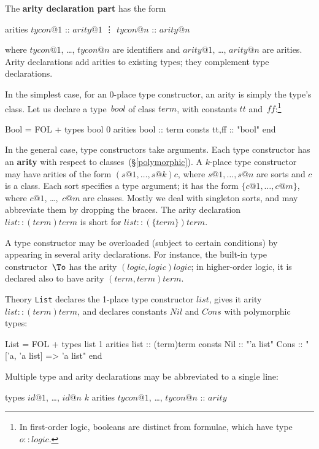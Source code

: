 The {\bf arity declaration part} has the form
\begin{ttbox}
arities \(tycon@1\) :: \(arity@1\)
        \vdots
        \(tycon@n\) :: \(arity@n\)
\end{ttbox}
where $tycon@1$, \ldots, $tycon@n$ are identifiers and $arity@1$, \ldots,
$arity@n$ are arities.  Arity declarations add arities to existing
types; they complement type declarations.

In the simplest case, for an 0-place type constructor, an arity is simply
the type's class.  Let us declare a type~$bool$ of class $term$, with
constants $tt$ and~$ff$:\footnote{In first-order logic, booleans are
distinct from formulae, which have type $o::logic$.}
\begin{ttbox} 
Bool = FOL +
types   bool 0
arities bool    :: term
consts  tt,ff   :: "bool"
end
\end{ttbox}
In the general case, type constructors take arguments.  Each type
constructor has an {\bf arity} with respect to
classes~(\S\ref{polymorphic}).  A $k$-place type constructor may have
arities of the form $(s@1,\ldots,s@k)c$, where $s@1,\ldots,s@n$ are sorts
and $c$ is a class.  Each sort specifies a type argument; it has the form
$\{c@1,\ldots,c@m\}$, where $c@1$, \dots,~$c@m$ are classes.  Mostly we
deal with singleton sorts, and may abbreviate them by dropping the braces.
The arity declaration $list{::}(term)term$ is short for
$list{::}(\{term\})term$.

A type constructor may be overloaded (subject to certain conditions) by
appearing in several arity declarations.  For instance, the built-in type
constructor~$\To$ has the arity $(logic,logic)logic$; in higher-order
logic, it is declared also to have arity $(term,term)term$.

Theory {\tt List} declares the 1-place type constructor $list$, gives
it arity $list{::}(term)term$, and declares constants $Nil$ and $Cons$ with
polymorphic types:
\begin{ttbox} 
List = FOL +
types   list 1
arities list    :: (term)term
consts  Nil     :: "'a list"
        Cons    :: "['a, 'a list] => 'a list" 
end
\end{ttbox}
Multiple type and arity declarations may be abbreviated to a single line:
\begin{ttbox}
types   \(id@1\), \ldots, \(id@n\) \(k\)
arities \(tycon@1\), \ldots, \(tycon@n\) :: \(arity\)
\end{ttbox}

